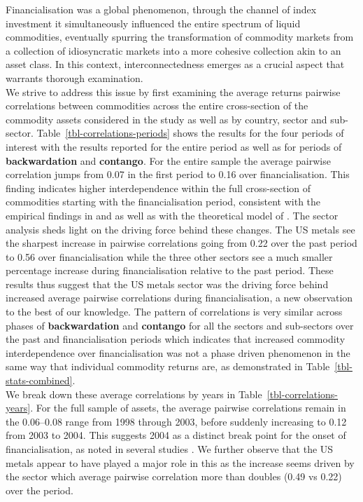 \documentclass[
  authoryear,
  preprint,
  3p]{elsarticle}
\begin{document}
\medskip

Financialisation was a global phenomenon, through the channel of index
investment it simultaneously influenced the entire spectrum of liquid
commodities, eventually spurring the transformation of commodity markets
from a collection of idiosyncratic markets into a more cohesive
collection akin to an asset class. In this context, interconnectedness
emerges as a crucial aspect that warrants thorough examination.\\
We strive to address this issue by first examining the average returns
pairwise correlations between commodities across the entire
cross-section of the commodity assets considered in the study as well as
by country, sector and sub-sector. Table~\ref{tbl-correlations-periods}
shows the results for the four periods of interest with the results
reported for the entire period as well as for periods of
\textbf{backwardation} and \textbf{contango}. For the entire sample the
average pairwise correlation jumps from 0.07 in the first period to 0.16
over financialisation. This finding indicates higher interdependence
within the full cross-section of commodities starting with the
financialisation period, consistent with the empirical findings in
\citet{fryMcKibbin_evolution_2023} and
\citet{mayer_financialization_2017} as well as with the theoretical
model of \citet{basak_model_2016}. The sector analysis sheds light on
the driving force behind these changes. The US metals see the sharpest
increase in pairwise correlations going from 0.22 over the past period
to 0.56 over financialisation while the three other sectors see a much
smaller percentage increase during financialisation relative to the past
period. These results thus suggest that the US metals sector was the
driving force behind increased average pairwise correlations during
financialisation, a new observation to the best of our knowledge. The
pattern of correlations is very similar across phases of
\textbf{backwardation} and \textbf{contango} for all the sectors and
sub-sectors over the past and financialisation periods which indicates
that increased commodity interdependence over financialisation was not a
phase driven phenomenon in the same way that individual commodity
returns are, as demonstrated in Table~\ref{tbl-stats-combined}.\\
We break down these average correlations by years in
Table~\ref{tbl-correlations-years}. For the full sample of assets, the
average pairwise correlations remain in the 0.06--0.08 range from 1998
through 2003, before suddenly increasing to 0.12 from 2003 to 2004. This
suggests 2004 as a distinct break point for the onset of
financialisation, as noted in several studies
\citep{baker_financialization_2021, tang_index_2012}. We further observe
that the US metals appear to have played a major role in this as the
increase seems driven by the sector which average pairwise correlation
more than doubles (0.49 vs 0.22) over the period.
\end{document}
